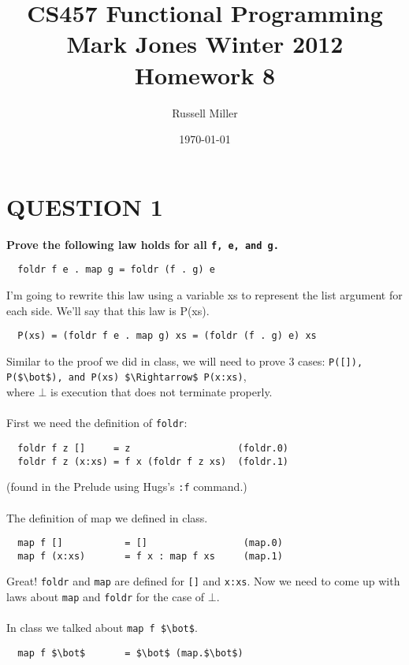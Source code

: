 \documentclass{article}
\title{CS457 Functional Programming\\
Mark Jones Winter 2012\\
Homework 8}
\author{Russell Miller}
\date{\today}
\begin{document}
\maketitle

\section*{QUESTION 1}
\textbf{Prove the following law holds for all \lstinline{f, e, and g.}}
\lstset{language=Haskell, mathescape=true, basicstyle=\ttfamily}
\begin{lstlisting}
  foldr f e . map g = foldr (f . g) e
\end{lstlisting}

\noindent I'm going to rewrite this law using a variable xs to represent the
list argument for each side. We'll say that this law is P(xs).
\begin{lstlisting}
  P(xs) = (foldr f e . map g) xs = (foldr (f . g) e) xs
\end{lstlisting}

\noindent Similar to the proof we did in class, we will need to prove 3 cases:
\lstinline{P([]), P($\bot$), and P(xs) $\Rightarrow$ P(x:xs)},\\
where $\bot$ is execution that does not
terminate properly.\\
\\
First we need the definition of \lstinline{foldr}:
\begin{lstlisting}
  foldr f z []     = z                   (foldr.0)
  foldr f z (x:xs) = f x (foldr f z xs)  (foldr.1)
\end{lstlisting}

\rm (found in the Prelude using Hugs's \lstinline{:f} command.)\\
\\
The definition of map we defined in class.
\begin{lstlisting}
  map f []           = []                 (map.0)
  map f (x:xs)       = f x : map f xs     (map.1)
\end{lstlisting}

\noindent Great! \lstinline{foldr} and \lstinline{map} are defined for 
\lstinline{[]} and \lstinline{x:xs}. Now we need to come up with laws about 
\lstinline{map} and \lstinline{foldr} for the case of $\bot$.\\
\\
In class we talked about \lstinline{map f $\bot$}.
\begin{lstlisting}
  map f $\bot$       = $\bot$ (map.$\bot$)
\end{lstlisting}
\end{document}
